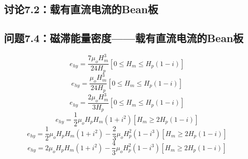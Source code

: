 \subsection{讨论7.2：载有直流电流的Bean板}


\subsection{问题7.4：磁滞能量密度——载有直流电流的Bean板}
\begin{equation}%
e_{hy}=\frac{7\mu_oH_{m}^{3}}{24H_p}      [0\leq H_m\leq H_p(1-i)]
\end{equation}
\begin{equation}%
e_{hy}=\frac{\mu_oH_{m}^{3}}{24H_p}       [0\leq H_m\leq H_p(1-i)]
\end{equation}
\begin{equation}%
e_{hy}=\frac{2\mu_oH_{m}^{3}}{3H_p}       [0\leq H_m\leq H_p(1-i)]
\end{equation}
\begin{equation}%
e_{hy}=\frac{1}{2}\mu_oH_pH_m(1+i^2)      [H_m\geq2H_p(1-i)]
\end{equation}
\begin{equation}%
e_{hy}=\frac{1}{2}\mu_oH_pH_m(1+i^2)-\frac{2}{3}\mu_oH_{p}^{2}(1-i^3)   [H_m\geq2H_p(1-i)]
\end{equation}
\begin{equation}%
e_{hy}=2\mu_oH_pH_m(1+i^2)-\frac{4}{3}\mu_oH_{p}^{2}(1-i^3)     [H_m\geq2H_p(1-i)]
\end{equation}


